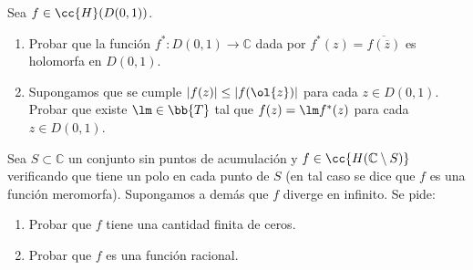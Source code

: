\documentclass[12pt]{article}
\begin{document}
    \begin{ejercicio}[2.5 puntos]
        Sea $f\in \cc{H}(D(0,1))$.
        \begin{enumerate}[label=\alph*)]
            \item Probar que la función $f^\ast:D(0,1)\to \mathbb{C}$ dada por $f^\ast(z) = \overline{f(\overline{z})}$ es holomorfa en $D(0,1)$.
            \item Supongamos que se cumple $|f(z)| \leq |f(\ol{z})|$ para cada $z\in D(0,1)$. Probar que existe $\lm\in \bb{T}$ tal que $f(z)=\lm f^\ast(z)$ para cada $z\in D(0,1)$.
        \end{enumerate}
    \end{ejercicio}

    \begin{ejercicio}[2.5 puntos]
        Sea $S\subset \mathbb{C}$ un conjunto sin puntos de acumulación y $f\in \cc{H(\mathbb{C}\setminus S)}$ verificando que tiene un polo en cada punto de $S$ (en tal caso se dice que $f$ es una función meromorfa). Supongamos a demás que $f$ diverge en infinito. Se pide:
        \begin{enumerate}[label=\alph*)]
            \item Probar que $f$ tiene una cantidad finita de ceros.
            \item Probar que $f$ es una función racional.
        \end{enumerate}
    \end{ejercicio}
\end{document}

